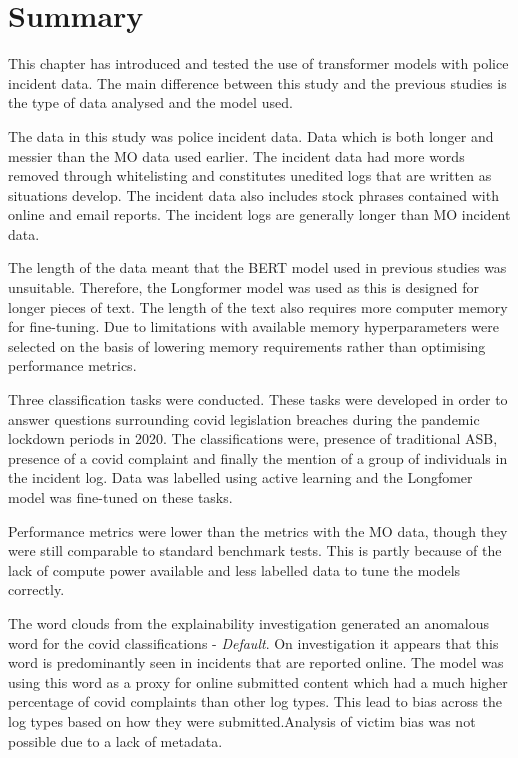 \section{Summary} This chapter has introduced and tested the use of transformer models with police incident data. The main difference between this study and the previous studies is the type of data analysed and the model used. 

The data in this study was police incident data. Data which is both longer and messier than the MO data used earlier. The incident data had more words removed through whitelisting and constitutes unedited logs that are written as situations develop. The incident data also includes stock phrases contained with online and email reports. The incident logs are generally longer than MO incident data.

The length of the data meant that the BERT model used in previous studies was unsuitable. Therefore, the Longformer model was used as this is designed for longer pieces of text. The length of the text also requires more computer memory for fine-tuning. Due to limitations with  available memory hyperparameters were selected on the basis of lowering memory requirements rather than optimising performance metrics.

Three classification tasks were conducted. These tasks were developed in order to answer questions surrounding covid legislation breaches during the pandemic lockdown periods in 2020. The classifications were, presence of traditional ASB, presence of a covid complaint and finally the mention of a group of individuals in the incident log. Data was labelled using active learning and the Longfomer model was fine-tuned on these tasks.

Performance metrics were lower than the metrics with the MO data, though they were still comparable to standard benchmark tests. This is partly because of the lack of compute power available  and less labelled data to tune the models correctly.

The word clouds from the explainability investigation generated an anomalous word for the covid classifications - \emph{Default}. On investigation it appears that this word is predominantly seen in incidents that are reported online. The model was using this word as a proxy for online submitted content which had a much higher percentage of covid complaints than other log types. This lead to bias across the log types based on how they were submitted.Analysis of victim bias was not possible due to a lack of metadata. 


